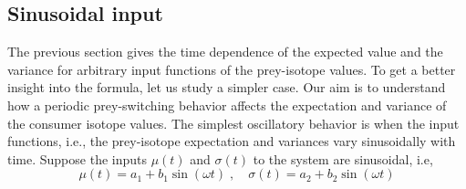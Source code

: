 \documentclass[12pt]{iopart}
\begin{document}
\subsection{Sinusoidal input}
The previous section gives the time dependence of the expected value and the variance for arbitrary input functions of the prey-isotope values. To get a better insight into the formula, let us study a simpler case. Our aim is to understand how a periodic prey-switching behavior affects the expectation and variance of the consumer isotope values. The simplest oscillatory behavior is when the input functions, i.e., the prey-isotope expectation and variances vary sinusoidally with time.
Suppose the inputs $\mu(t)$ and $\sigma(t)$ to the system are sinusoidal, i.e,
\begin{equation}
\label{sin-input}
\mu(t)=a_1 + b_1 \sin{(\omega t)}\;,\quad\sigma(t)=a_2+b_2\sin{(\omega t)}
\end{equation}
\end{document}
